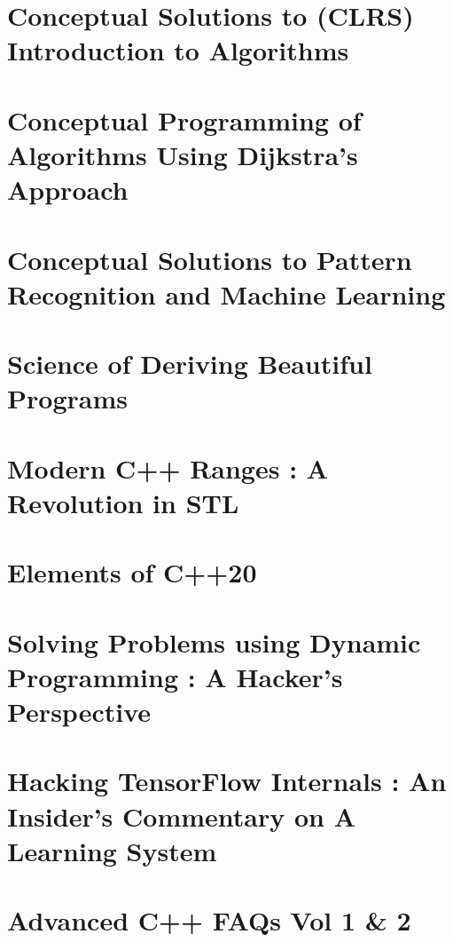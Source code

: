 \documentclass[makeidx, 12pt, oneside, onecolumn, openright, final, svgnames, dvipsnames, extrafontsizes]{memoir}
\theoremstyle{problemstyle}
\begin{document}
\chapter{Conceptual Solutions to (CLRS) Introduction to Algorithms}

\chapter{Conceptual Programming of Algorithms Using Dijkstra’s Approach}

\chapter{Conceptual Solutions to Pattern Recognition and Machine Learning}

\chapter{Science of Deriving Beautiful Programs}

\chapter{Modern C++ Ranges : A Revolution in STL}

\chapter{Elements of C++20}

\chapter{Solving Problems using Dynamic Programming : A Hacker’s Perspective}



\chapter{Hacking TensorFlow Internals : An Insider’s Commentary on A Learning System}

\chapter{Advanced C++ FAQs Vol 1 \& 2}
\end{document}
